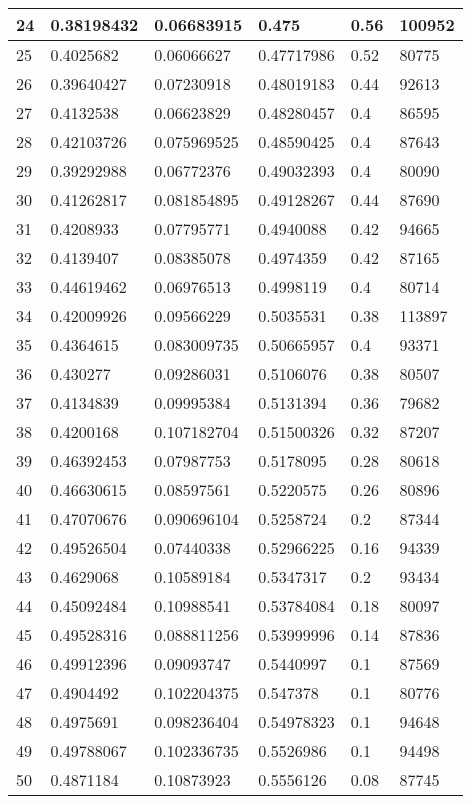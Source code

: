 \begin{longtable}{|l|l|l|l|l|l|}
24 & 0.38198432 & 0.06683915 & 0.475 & 0.56 & 100952 \\ \hline 
25 & 0.4025682 & 0.06066627 & 0.47717986 & 0.52 & 80775 \\ \hline 
26 & 0.39640427 & 0.07230918 & 0.48019183 & 0.44 & 92613 \\ \hline 
27 & 0.4132538 & 0.06623829 & 0.48280457 & 0.4 & 86595 \\ \hline 
28 & 0.42103726 & 0.075969525 & 0.48590425 & 0.4 & 87643 \\ \hline 
29 & 0.39292988 & 0.06772376 & 0.49032393 & 0.4 & 80090 \\ \hline 
30 & 0.41262817 & 0.081854895 & 0.49128267 & 0.44 & 87690 \\ \hline 
31 & 0.4208933 & 0.07795771 & 0.4940088 & 0.42 & 94665 \\ \hline 
32 & 0.4139407 & 0.08385078 & 0.4974359 & 0.42 & 87165 \\ \hline 
33 & 0.44619462 & 0.06976513 & 0.4998119 & 0.4 & 80714 \\ \hline 
34 & 0.42009926 & 0.09566229 & 0.5035531 & 0.38 & 113897 \\ \hline 
35 & 0.4364615 & 0.083009735 & 0.50665957 & 0.4 & 93371 \\ \hline 
36 & 0.430277 & 0.09286031 & 0.5106076 & 0.38 & 80507 \\ \hline 
37 & 0.4134839 & 0.09995384 & 0.5131394 & 0.36 & 79682 \\ \hline 
38 & 0.4200168 & 0.107182704 & 0.51500326 & 0.32 & 87207 \\ \hline 
39 & 0.46392453 & 0.07987753 & 0.5178095 & 0.28 & 80618 \\ \hline 
40 & 0.46630615 & 0.08597561 & 0.5220575 & 0.26 & 80896 \\ \hline 
41 & 0.47070676 & 0.090696104 & 0.5258724 & 0.2 & 87344 \\ \hline 
42 & 0.49526504 & 0.07440338 & 0.52966225 & 0.16 & 94339 \\ \hline 
43 & 0.4629068 & 0.10589184 & 0.5347317 & 0.2 & 93434 \\ \hline 
44 & 0.45092484 & 0.10988541 & 0.53784084 & 0.18 & 80097 \\ \hline 
45 & 0.49528316 & 0.088811256 & 0.53999996 & 0.14 & 87836 \\ \hline 
46 & 0.49912396 & 0.09093747 & 0.5440997 & 0.1 & 87569 \\ \hline 
47 & 0.4904492 & 0.102204375 & 0.547378 & 0.1 & 80776 \\ \hline 
48 & 0.4975691 & 0.098236404 & 0.54978323 & 0.1 & 94648 \\ \hline 
49 & 0.49788067 & 0.102336735 & 0.5526986 & 0.1 & 94498 \\ \hline 
50 & 0.4871184 & 0.10873923 & 0.5556126 & 0.08 & 87745 \\ \hline 
\end{longtable}